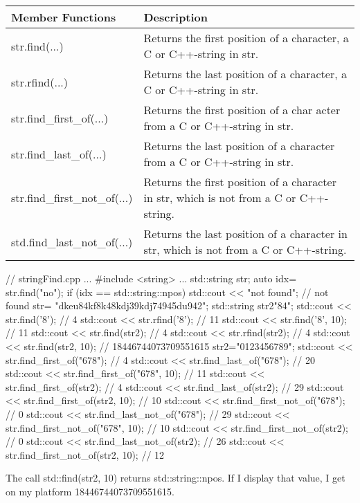\begin{longtable}[c]{|l|l|}
\hline
\textbf{Member Functions} & \textbf{Description}                                                      \\ \hline
\endfirsthead
%
\endhead
%
str.find(...)             & Returns the first position of a character, a C or C++-string in str.      \\ \hline
str.rfind(...)            & Returns the last position of a character, a C or C++-string in str.       \\ \hline
str.find\_first\_of(...)  & Returns the first position of a char acter from a C or C++-string in str. \\ \hline
str.find\_last\_of(...)   & Returns the last position of a character from a C or C++-string in str.   \\ \hline
str.find\_first\_not\_of(...) & Returns the first position of a character in str, which is not from a C or C++-string. \\ \hline
std.find\_last\_not\_of(...)  & Returns the last position of a character in str, which is not from a C or C++-string.  \\ \hline
\end{longtable}


\begin{cpp}
// stringFind.cpp
...
#include <string>
...
std::string str;
auto idx= str.find("no");
if (idx == std::string::npos) std::cout << "not found"; // not found
str= {"dkeu84kf8k48kdj39kdj74945du942"};
std::string str2{"84"};
std::cout << str.find('8'); // 4
std::cout << str.rfind('8'); // 11
std::cout << str.find('8', 10); // 11
std::cout << str.find(str2); // 4
std::cout << str.rfind(str2); // 4
std::cout << str.find(str2, 10); // 18446744073709551615
str2="0123456789";
std::cout << str.find_first_of("678"); // 4
std::cout << str.find_last_of("678"); // 20
std::cout << str.find_first_of("678", 10); // 11
std::cout << str.find_first_of(str2); // 4
std::cout << str.find_last_of(str2); // 29
std::cout << str.find_first_of(str2, 10); // 10
std::cout << str.find_first_not_of("678"); // 0
std::cout << str.find_last_not_of("678"); // 29
std::cout << str.find_first_not_of("678", 10); // 10
std::cout << str.find_first_not_of(str2); // 0
std::cout << str.find_last_not_of(str2); // 26
std::cout << str.find_first_not_of(str2, 10); // 12
\end{cpp}

The call std::find(str2, 10) returns std::string::npos. If I display that value, I get on my platform 18446744073709551615.












